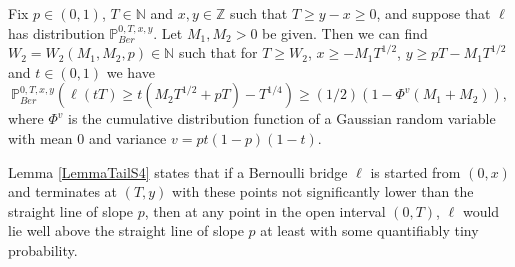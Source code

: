 \begin{lemma}\label{LemmaTailS4}Fix $p \in (0,1)$, $T \in \mathbb{N}$ and $x, y\in \mathbb{Z}$ such that $T \geq y-x \geq 0$, and suppose that $\ell$ has distribution $\mathbb{P}^{0,T,x,y}_{Ber}$. Let $M_1,M_2 > 0$ be given. Then we can find $W_2 = W_2(M_1,M_2,p) \in \mathbb{N}$ such that for $T \geq W_2$, $ x \geq -M_1T^{1/2}$, $ y \geq pT -  M_1T^{1/2}$ and $t\in(0,1)$ we have
\begin{equation}\label{halfEq2S4}
\mathbb{P}^{0,T,x,y}_{Ber}\left( \ell(tT)  \geq t(M_2T^{1/2} + pT) - T^{1/4} \right) \geq (1/2) (1 - \Phi^{v}(M_1 + M_2) ),
\end{equation}
where $\Phi^{v}$ is the cumulative distribution function  of a Gaussian random variable with mean $0$ and variance $v = pt(1-p)(1-t)$.
\end{lemma}
\begin{remark} Lemma \ref{LemmaTailS4} states that  if a Bernoulli bridge $\ell$ is started from $(0,x)$ and terminates at $(T,y)$ with these points not significantly lower than the straight line of slope $p$, then at any point in the open interval $(0,T)$, $\ell$ would lie well above the straight line of slope $p$ at least with some quantifiably tiny probability.
\end{remark}
